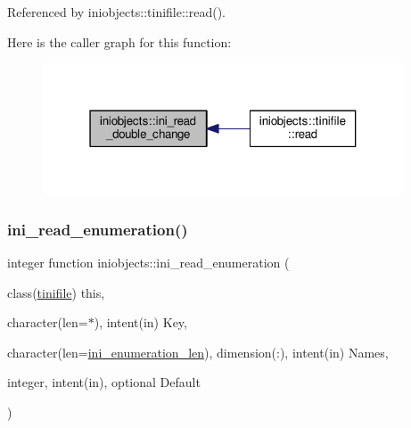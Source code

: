 Referenced by iniobjects\+::tinifile\+::read().

Here is the caller graph for this function\+:
\nopagebreak
\begin{figure}[H]
\begin{center}
\leavevmode
\includegraphics[width=304pt]{namespaceiniobjects_a5e063b545af508f22c652618784a4106_icgraph}
\end{center}
\end{figure}
\mbox{\label{namespaceiniobjects_a6dcfc3786b1d30b745d72bd0ec892ba4}} 
\subsubsection{\texorpdfstring{ini\+\_\+read\+\_\+enumeration()}{ini\_read\_enumeration()}}
{\footnotesize\ttfamily integer function iniobjects\+::ini\+\_\+read\+\_\+enumeration (\begin{DoxyParamCaption}\item[{class(\mbox{\hyperlink{structiniobjects_1_1tinifile}{tinifile}})}]{this,  }\item[{character(len=$\ast$), intent(in)}]{Key,  }\item[{character(len=\mbox{\hyperlink{namespaceiniobjects_ad4e84129fd47c679fb1fcdd444d9fc84}{ini\+\_\+enumeration\+\_\+len}}), dimension(\+:), intent(in)}]{Names,  }\item[{integer, intent(in), optional}]{Default }\end{DoxyParamCaption})\hspace{0.3cm}{\ttfamily [private]}}

\mbox{\label{namespaceiniobjects_abd02c75afc73274d508c0c1eb3cecca5}} 
